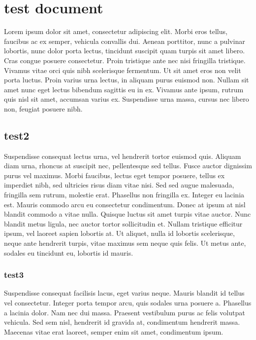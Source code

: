 \documentclass{jamk-report}
\begin{document}
\section{test document}


Lorem ipsum dolor sit amet, consectetur adipiscing elit. Morbi
eros tellus, faucibus ac ex semper, vehicula convallis dui. Aenean
porttitor, nunc a pulvinar lobortis, nunc dolor porta lectus,
tincidunt suscipit quam turpis sit amet libero. Cras congue
posuere consectetur. Proin tristique ante nec nisi fringilla
tristique. Vivamus vitae orci quis nibh scelerisque fermentum. Ut
sit amet eros non velit porta luctus. Proin varius urna lectus, in
aliquam purus euismod non. Nullam sit amet nunc eget lectus
bibendum sagittis eu in ex. Vivamus ante ipsum, rutrum quis nisl
sit amet, accumsan varius ex. Suspendisse urna massa, cursus nec
libero non, feugiat posuere nibh.

\subsection{test2}

Suspendisse consequat lectus urna, vel hendrerit tortor euismod
quis. Aliquam diam urna, rhoncus at suscipit nec, pellentesque sed
tellus. Fusce auctor dignissim purus vel maximus. Morbi faucibus,
lectus eget tempor posuere, tellus ex imperdiet nibh, sed
ultricies risus diam vitae nisi. Sed sed augue malesuada,
fringilla sem rutrum, molestie erat. Phasellus non fringilla ex.
Integer eu lacinia est. Mauris commodo arcu eu consectetur
condimentum. Donec at ipsum at nisl blandit commodo a vitae nulla.
Quisque luctus sit amet turpis vitae auctor. Nunc blandit metus
ligula, nec auctor tortor sollicitudin et. Nullam tristique
efficitur ipsum, vel laoreet sapien lobortis at. Ut aliquet, nulla
id lobortis scelerisque, neque ante hendrerit turpis, vitae
maximus sem neque quis felis. Ut metus ante, sodales eu tincidunt
eu, lobortis id mauris.

\subsubsection{test3}

Suspendisse consequat facilisis lacus, eget varius neque. Mauris
blandit id tellus vel consectetur. Integer porta tempor arcu, quis
sodales urna posuere a. Phasellus a lacinia dolor. Nam nec dui
massa. Praesent vestibulum purus ac felis volutpat vehicula. Sed
sem nisl, hendrerit id gravida at, condimentum hendrerit massa.
Maecenas vitae erat laoreet, semper enim sit amet, condimentum
ipsum.
\end{document}
